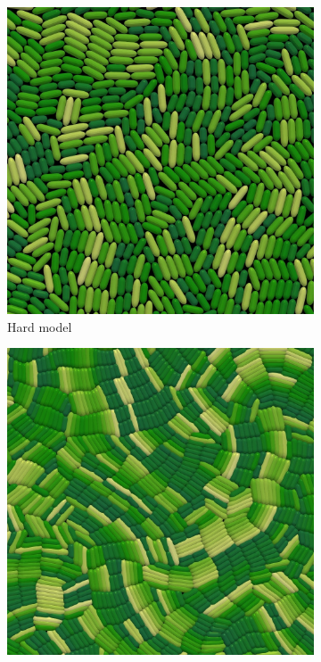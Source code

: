 \documentclass[conference]{IEEEtran}
\begin{document}
\begin{figure}[H]
    \centering
    \begin{subfigure}[b]{0.49\columnwidth}
        \centering
        \includegraphics[width=\linewidth]{figures/comparison_plots/density_hard.jpeg}
        \caption{Hard model}
    \end{subfigure}
    \begin{subfigure}[b]{0.49\columnwidth}
        \centering
        \includegraphics[width=\linewidth]{figures/comparison_plots/density_soft.jpeg}

\end{subfigure}
\end{figure}
\end{document}
